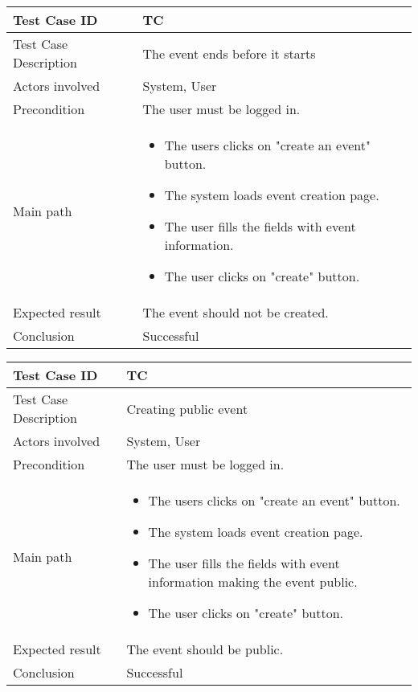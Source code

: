 \begin{center} \begin{tabular}{|l|l|}
  \hline
  Test Case ID & TC \z\\
  \hline
  Test Case Description & The event ends before it starts\\
  \hline
  Actors involved & System, User\\
   \hline
  Precondition & The user must be logged in.\\
  \hline
  Main path &   \begin{minipage}{5in}
    \vskip 4pt
            \begin{itemize}
              \item The users clicks on "create an event" button.
              \item The system loads event creation page.
              \item The user fills the fields with event information.
              \item The user clicks on "create" button.
            \end{itemize}
    \vskip 4pt
  \end{minipage}  \\
  \hline
  Expected result & The event should not be created. \\
  \hline
  Conclusion & Successful\\
  \hline
\end{tabular} \end{center}

\begin{center} \begin{tabular}{|l|l|}
  \hline
  Test Case ID & TC \z\\
  \hline
  Test Case Description & Creating public event\\
  \hline
  Actors involved & System, User\\
   \hline
  Precondition & The user must be logged in.\\
  \hline
  Main path &   \begin{minipage}{5in}
    \vskip 4pt
            \begin{itemize}
              \item The users clicks on "create an event" button.
              \item The system loads event creation page.
              \item The user fills the fields with event information making the event public.
              \item The user clicks on "create" button.
            \end{itemize}
    \vskip 4pt
  \end{minipage}  \\
  \hline
  Expected result & The event should be public.\\
  \hline
  Conclusion & Successful\\
  \hline
\end{tabular} \end{center}


